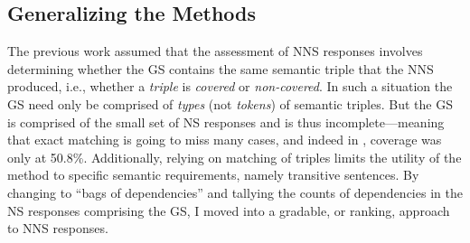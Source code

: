 %
%
%

\subsection{Generalizing the Methods}
\label{sec:ranking}

The previous work assumed that the assessment of NNS responses
involves determining whether the GS contains the same
semantic triple that the NNS produced, i.e., whether a \textit{triple}
is \textit{covered} or \textit{non-covered}.  In such a situation the
GS need only be comprised of \textit{types} (not \textit{tokens}) of semantic triples.  But
the GS is comprised of the small set of NS responses and is thus
incomplete---meaning that exact matching is going to miss many cases,
and indeed in \citet{king:dickinson:13}, coverage was only at 50.8\%.  Additionally, relying on matching
of triples limits the utility of the method to specific semantic
requirements, namely transitive sentences.  By changing to ``bags of
dependencies'' and tallying the counts of dependencies in the NS responses comprising the GS, I
moved into a gradable, or ranking, approach to NNS responses.

